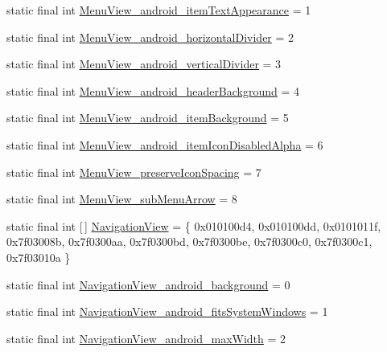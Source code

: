 \begin{DoxyCompactItemize}
static final int \mbox{\hyperlink{classandroid_1_1support_1_1design_1_1R_1_1styleable_a7a53c46d2afe09a8f3a1ba5c28c757f7}{Menu\+View\+\_\+android\+\_\+item\+Text\+Appearance}} = 1
\item 
static final int \mbox{\hyperlink{classandroid_1_1support_1_1design_1_1R_1_1styleable_a479d3dd424d384893ed17a0c1d15c413}{Menu\+View\+\_\+android\+\_\+horizontal\+Divider}} = 2
\item 
static final int \mbox{\hyperlink{classandroid_1_1support_1_1design_1_1R_1_1styleable_a08c33b701e90e1157d2bb6ff33d34134}{Menu\+View\+\_\+android\+\_\+vertical\+Divider}} = 3
\item 
static final int \mbox{\hyperlink{classandroid_1_1support_1_1design_1_1R_1_1styleable_a6b1adf92334f4d846399c03132c5ea81}{Menu\+View\+\_\+android\+\_\+header\+Background}} = 4
\item 
static final int \mbox{\hyperlink{classandroid_1_1support_1_1design_1_1R_1_1styleable_a5db21fb17308a868d9c88a641e23e10f}{Menu\+View\+\_\+android\+\_\+item\+Background}} = 5
\item 
static final int \mbox{\hyperlink{classandroid_1_1support_1_1design_1_1R_1_1styleable_a0798b766a0bf98edc65330f9686e5ce1}{Menu\+View\+\_\+android\+\_\+item\+Icon\+Disabled\+Alpha}} = 6
\item 
static final int \mbox{\hyperlink{classandroid_1_1support_1_1design_1_1R_1_1styleable_ae40116afa0e62bdf6af6d28c82e6a05e}{Menu\+View\+\_\+preserve\+Icon\+Spacing}} = 7
\item 
static final int \mbox{\hyperlink{classandroid_1_1support_1_1design_1_1R_1_1styleable_a352b57921080ad1173656d23983518f6}{Menu\+View\+\_\+sub\+Menu\+Arrow}} = 8
\item 
static final int \mbox{[}$\,$\mbox{]} \mbox{\hyperlink{classandroid_1_1support_1_1design_1_1R_1_1styleable_a277c199f371e8804c26e2cd6dbf88999}{Navigation\+View}} = \{ 0x010100d4, 0x010100dd, 0x0101011f, 0x7f03008b, 0x7f0300aa, 0x7f0300bd, 0x7f0300be, 0x7f0300c0, 0x7f0300c1, 0x7f03010a \}
\item 
static final int \mbox{\hyperlink{classandroid_1_1support_1_1design_1_1R_1_1styleable_a1774b647af0eb6637aea1d2b9ac5d9eb}{Navigation\+View\+\_\+android\+\_\+background}} = 0
\item 
static final int \mbox{\hyperlink{classandroid_1_1support_1_1design_1_1R_1_1styleable_ab02ea2b7f96484c64a3ebd95e5e2369d}{Navigation\+View\+\_\+android\+\_\+fits\+System\+Windows}} = 1
\item 
static final int \mbox{\hyperlink{classandroid_1_1support_1_1design_1_1R_1_1styleable_ad1d7cfceea7a309d841cd3db426f7f4c}{Navigation\+View\+\_\+android\+\_\+max\+Width}} = 2

\end{DoxyCompactItemize}
